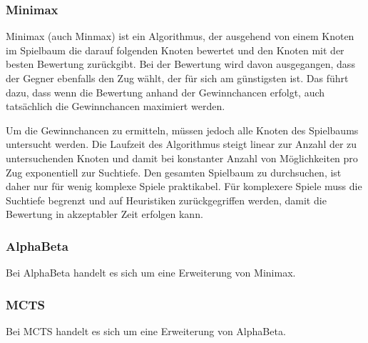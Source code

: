 
\subsubsection{Minimax}

Minimax (auch Minmax) ist ein Algorithmus, der ausgehend von einem Knoten im Spielbaum die darauf folgenden Knoten bewertet und den Knoten mit der besten Bewertung zurückgibt. Bei der Bewertung wird davon ausgegangen, dass der Gegner ebenfalls den Zug wählt, der für sich am günstigsten ist. Das führt dazu, dass wenn die Bewertung anhand der Gewinnchancen erfolgt, auch tatsächlich die Gewinnchancen maximiert werden.

Um die Gewinnchancen zu ermitteln, müssen jedoch alle Knoten des Spielbaums untersucht werden. Die Laufzeit des Algorithmus steigt linear zur Anzahl der zu untersuchenden Knoten und damit bei konstanter Anzahl von Möglichkeiten pro Zug exponentiell zur Suchtiefe. Den gesamten Spielbaum zu durchsuchen, ist daher nur für wenig komplexe Spiele praktikabel. Für komplexere Spiele muss die Suchtiefe begrenzt und auf Heuristiken zurückgegriffen werden, damit die Bewertung in akzeptabler Zeit erfolgen kann\cite{Ferguson.January2019}\cite{Heineman.October2008}.

\subsubsection{AlphaBeta}

Bei AlphaBeta handelt es sich um eine Erweiterung von Minimax.

\subsubsection{MCTS}

Bei MCTS handelt es sich um eine Erweiterung von AlphaBeta.